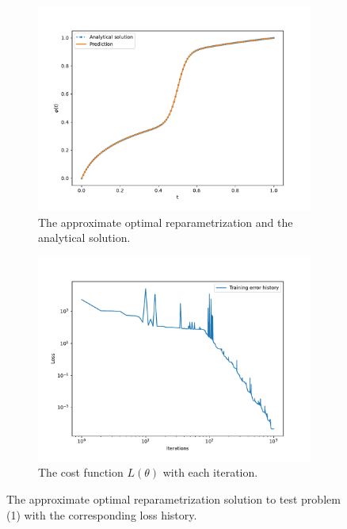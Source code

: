 \begin{figure}[t]\label{fig:curve_1_example}
    \begin{subfigure}[t]{0.5\textwidth}\label{fig:curve_1_solution}
        \centering
        \includegraphics[width=\linewidth]{figures/curve_1/eks_5/plot_2_0.pdf}
        \caption{The approximate optimal reparametrization and the analytical solution.}
    \end{subfigure}
    \begin{subfigure}[t]{0.5\textwidth}\label{fig:curve_1_history}
        \centering
        \includegraphics[width=\linewidth]{figures/curve_1/eks_5/history_plot_2.pdf}
        \caption{The cost function \(L(\theta)\) with each iteration.}
    \end{subfigure}
    \caption{The approximate optimal reparametrization solution to test problem (1) with the corresponding loss history.}
\end{figure}

